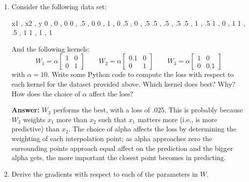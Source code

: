 \documentclass[submit]{harvardml}
\begin{document}
\begin{enumerate}
\item Consider the following data set:
\begin{csv}
x1 , x2 , y 
  0 , 0 , 0
  0 , .5 , 0
  0 , 1 , 0 
  .5 , 0 , .5
  .5 , .5 , .5
  .5 , 1 , .5
  1 , 0 , 1
  1 , .5 , 1
  1 , 1 , 1 
\end{csv}
And the following kernels:
\begin{equation*} 
W_1 = \alpha \begin{bmatrix}
  1 & 0 \\
  0 & 1 
\end{bmatrix}
\qquad
W_2 = \alpha \begin{bmatrix}
  0.1 & 0 \\
  0 & 1 
\end{bmatrix}
\qquad
W_3 = \alpha \begin{bmatrix}
  1 & 0 \\
  0 & 0.1 
\end{bmatrix}
\end{equation*} 
with $\alpha = 10$. Write some Python code to compute the loss with respect
to each kernel for the dataset provided above. Which kernel does best?  Why?  How does the choice of $\alpha$ affect the loss?  

\textbf{Answer:} $W_3$ performs the best, with a loss of $.025$. This is probably because $W_3$ weights $x_1$ more than $x_2$ such that $x_1$ matters more (i.e., is more predictive) than $x_2$. The choice of alpha affects the loss by determining the weighting of each interpolation point; as alpha approaches zero the surrounding points approach equal affect on the prediction and the bigger alpha gets, the more important the closest point becomes in predicting. 

\item Derive the gradients with respect to each of the parameters in
  $W$.
  

\end{enumerate}
\end{document}
